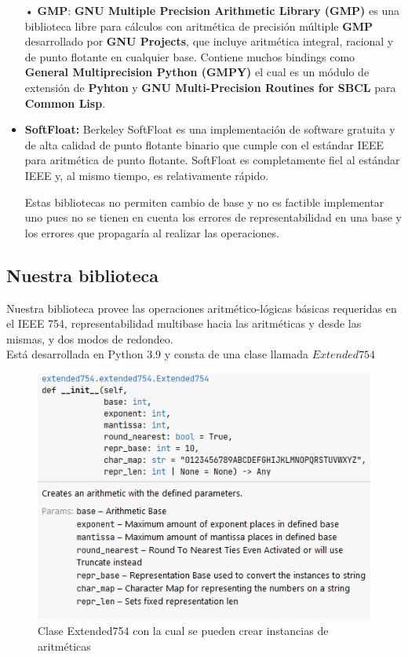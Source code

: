 \documentclass[a4paper,10pt,twocolumn]{article}
\begin{document}
	\begin{itemize}
		\item[•] \textbf{GMP}: \textbf{GNU Multiple Precision Arithmetic Library (GMP)} es una biblioteca libre para cálculos con aritmética de precisión múltiple  \textbf{GMP} desarrollado por \textbf{GNU Projects}, que incluye aritmética integral, racional y de punto flotante en cualquier base. Contiene muchos bindings como \textbf{General Multiprecision Python (GMPY)} el cual es un módulo de extensión de \textbf{Pyhton} y \textbf{GNU Multi-Precision Routines for SBCL} para \textbf{Common Lisp}. 
		
		\item 
		\textbf{SoftFloat:}
		Berkeley SoftFloat es una implementación de software gratuita y de alta calidad de punto flotante binario que cumple con el estándar IEEE para aritmética de punto flotante. SoftFloat es completamente fiel al estándar IEEE y, al mismo tiempo, es relativamente rápido. 
		
		Estas bibliotecas no permiten cambio de base y no es factible implementar uno pues no se tienen en cuenta los errores de representabilidad en una base y los errores que propagaría al realizar las operaciones.
	\end{itemize}
	
	
	\subsection{Nuestra biblioteca}
	
	Nuestra biblioteca provee las operaciones aritmético-lógicas básicas requeridas en el IEEE 754, representabilidad multibase hacia las aritméticas y desde las mismas, y dos modos de redondeo.\\
	
	Está desarrollada en Python 3.9 y consta de una clase llamada $Extended754$ \\
	\begin{figure}[H]
		\centering
		\includegraphics[width=1.1\linewidth]{res/extendedclass}
		\caption{Clase Extended754 con la cual se pueden crear instancias de aritméticas}
	\end{figure}
	
\end{document}
